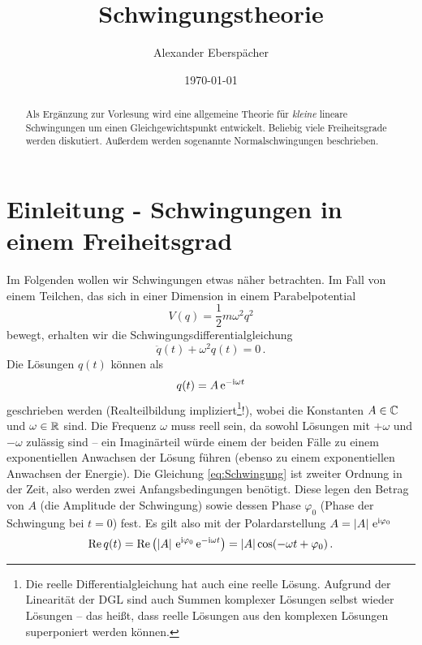 \documentclass[paper=a4, fontsize=11.0pt, abstractoff, DIV12]{scrartcl}
\title{Schwingungstheorie}
\author{Alexander Eberspächer}
\date{\today}
\begin{document}
\maketitle
\begin{abstract}
Als Ergänzung zur Vorlesung wird eine allgemeine Theorie für \emph{kleine}
lineare Schwingungen um einen Gleichgewichtspunkt entwickelt. Beliebig viele
Freiheitsgrade werden diskutiert. Außerdem werden sogenannte
Normalschwingungen beschrieben.
\end{abstract}

\section{Einleitung - Schwingungen in einem Freiheitsgrad}

Im Folgenden wollen wir Schwingungen etwas näher betrachten. Im Fall von
einem Teilchen, das sich in einer Dimension in einem Parabelpotential
\begin{equation}
V(q) = \frac{1}{2} m \omega^2 q^2
\label{eq:Pot}
\end{equation}
bewegt, erhalten wir die Schwingungsdifferentialgleichung
\begin{equation}
\ddot{q}(t) + \omega^2 q(t) = 0 \, .
\label{eq:Schwingung}
\end{equation}
Die Lösungen $q(t)$ können als
\begin{equation}
q(t) = A\,{\mathrm{e}}^{-\mathrm{i} \omega t}
\end{equation}
geschrieben werden (Realteilbildung impliziert\footnote{Die reelle
Differentialgleichung hat auch eine reelle Lösung. Aufgrund der Linearität
der DGL sind auch Summen komplexer Lösungen selbst wieder Lösungen -- das
heißt, dass reelle Lösungen aus den komplexen Lösungen superponiert werden
können.}!), wobei die Konstanten $A \in \mathbb{C}$ und $\omega \in \mathbb{R}$
sind. Die Frequenz $\omega$ muss reell sein, da sowohl Lösungen mit $+\omega$
und $-\omega$ zulässig sind -- ein Imaginärteil würde einem der beiden
Fälle zu einem exponentiellen Anwachsen der Lösung führen (ebenso zu einem
exponentiellen Anwachsen der Energie). Die Gleichung \eqref{eq:Schwingung}
ist zweiter Ordnung in der Zeit, also werden zwei Anfangsbedingungen
benötigt. Diese legen den Betrag von $A$ (die Amplitude der Schwingung)
sowie dessen Phase $\varphi_0$ (Phase der Schwingung bei $t=0$) fest. Es
gilt also mit der Polardarstellung $A = \left\vert A \right\vert\,{\mathrm{e}}^{\mathrm{i}\varphi_0}$
\begin{equation}
\operatorname{Re} q(t) = \operatorname{Re}\left( \left\vert A \right\vert\,{\mathrm{e}}^{\mathrm{i}\varphi_0}\,{\mathrm{e}}^{-\mathrm{i}\omega t}\right) = \left\vert A \right\vert \cos(-\omega t + \varphi_0)\, .
\end{equation}
\end{document}
